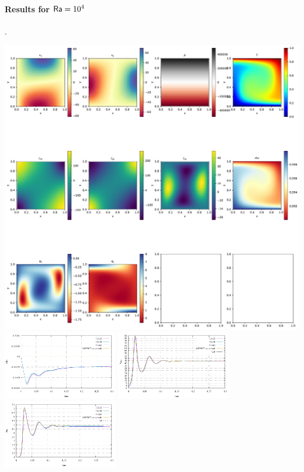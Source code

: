 \paragraph{Results for ${\mathsf{Ra}}=10^4$}.
\begin{center}
\includegraphics[width=16cm]{python_codes/fieldstone_03/results_1e4/64x64/solution.pdf}\\
\includegraphics[width=5cm]{python_codes/fieldstone_03/results_1e4/Tavrg.pdf}
\includegraphics[width=5cm]{python_codes/fieldstone_03/results_1e4/vrms.pdf}\\
\includegraphics[width=5cm]{python_codes/fieldstone_03/results_1e4/Nu.pdf}

\end{center}
